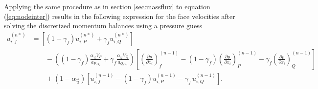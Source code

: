   Applying the same procedure as in section \ref{sec:massflux} to equation (\ref{eq:nodeinter}) results in the following expression for the face velocities after solving the discretized momentum balances using a pressure guess
  \begin{align}
    \label{eq:faceinter}
    u_{i,f}^{(n*)} 
    &=
    \left[\left(1 - \gamma_f\right) u_{i,P}^{(n*)} + \gamma_f u_{i,Q}^{(n*)} \right] \nonumber \\[1em]
    &\quad\quad - 
    \left(\left(1 - \gamma_f\right) \frac{\alpha_\vec{u} V_P}{a_{P,u_i}} + \gamma_f \frac{\alpha_\vec{u} V_Q}{a_{Q,u_i}}\right)
    \left[ 
    \left(\frac{\partial p}{\partial x_i}\right)_f^{(n-1)} 
    - \left( 1 - \gamma_f \right) \left( \frac{\partial p}{\partial x_i} \right)_P^{(n-1)} 
    - \gamma_f \left(\frac{\partial p}{\partial x_i}\right)_Q^{(n-1)}
    \right] \nonumber \\[1em]
    &\quad\quad + \left(1 - \alpha_\vec{u}\right) \left[ u_{i,f}^{(n-1)} - \left(1 - \gamma_f\right) u_{i,P}^{(n-1)} - \gamma_f \, u_{i,Q}^{(n-1)} \right].
  \end{align}

